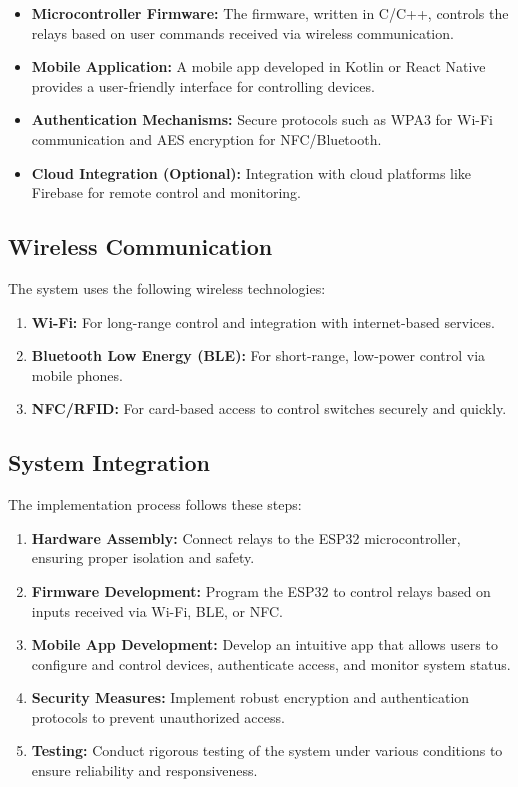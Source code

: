 \begin{itemize}
	\item \textbf{Microcontroller Firmware:} The firmware, written in C/C++, controls the relays based on user commands received via wireless communication.
	\item \textbf{Mobile Application:} A mobile app developed in Kotlin or React Native provides a user-friendly interface for controlling devices.
	\item \textbf{Authentication Mechanisms:} Secure protocols such as WPA3 for Wi-Fi communication and AES encryption for NFC/Bluetooth.
	\item \textbf{Cloud Integration (Optional):} Integration with cloud platforms like Firebase for remote control and monitoring.
\end{itemize}

\subsection*{Wireless Communication}
The system uses the following wireless technologies:

\begin{enumerate}
	\item \textbf{Wi-Fi:} For long-range control and integration with internet-based services.
	\item \textbf{Bluetooth Low Energy (BLE):} For short-range, low-power control via mobile phones.
	\item \textbf{NFC/RFID:} For card-based access to control switches securely and quickly.
\end{enumerate}

\subsection*{System Integration}
The implementation process follows these steps:

\begin{enumerate}
	\item \textbf{Hardware Assembly:} Connect relays to the ESP32 microcontroller, ensuring proper isolation and safety.
	\item \textbf{Firmware Development:} Program the ESP32 to control relays based on inputs received via Wi-Fi, BLE, or NFC.
	\item \textbf{Mobile App Development:} Develop an intuitive app that allows users to configure and control devices, authenticate access, and monitor system status.
	\item \textbf{Security Measures:} Implement robust encryption and authentication protocols to prevent unauthorized access.
	\item \textbf{Testing:} Conduct rigorous testing of the system under various conditions to ensure reliability and responsiveness.
\end{enumerate}

